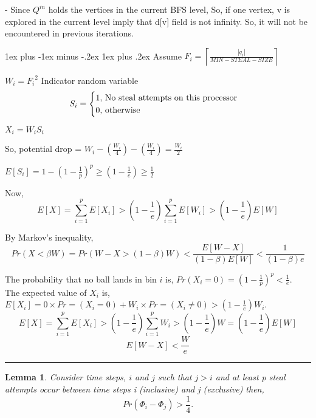 \documentclass[11pt]{article}
\makeatletter
\renewcommand{\subsection}{\@startsection{subsection}{2}{0mm}%
                                     {1ex plus -1ex minus -.2ex}%
                                     {1ex plus .2ex}%
                                     {\normalfont\large\bfseries}}%
\newenvironment{proof}{{\bf Proof:  }}{\hfill\rule{2mm}{2mm}}
\newtheorem{lemma}[fact]{Lemma}
\newcommand{\ceil}[1]{\ensuremath{\left\lceil#1\right\rceil}}
\makeatother
\begin{document}
- Since $Q^{in}$ holds the vertices in the current BFS level, So, if one vertex, v is explored in the current level imply that d[v] field is not infinity. So, it will not be encountered in previous iterations.      
 

\subsection{}
Assume $F_i = \ceil {\frac {|q_i|}{MIN-STEAL-SIZE}}$

$W_i = {F_i}^2$
Indicator random variable \[
S_i = \begin{cases}
1 , $ No steal attempts on this processor$\\
0 , $  otherwise$
\end{cases}
\]

$X_i = W_i S_i$

So, potential drop = $W_i - (\frac{W_i}{4}) - (\frac{W_i}{4}) = \frac{W_i}{2}$

$E[S_i] = 1 - {(1-\frac{1}{p})}^p \geq (1-\frac{1}{e}) \geq \frac{1}{2}$

Now, \[
E \left[ X \right] = \sum \limits_{i=1}^p E \left[ X_i \right] > \left( 1 - \frac{1}{e} \right) \sum \limits_{i=1}^p E[W_i] >\left( 1 - \frac{1}{e} \right) E \left [W \right ]
\]

By Markov's inequality,\\
\[Pr \left( X < \beta W \right) = Pr \left( W - X > (1 - \beta)W \right) < \frac {E \left[ W - X \right]}{\left(1 - \beta \right)  E[W]} < \frac {1}{\left(1 - \beta \right) e }
\]





\begin{proof}
The probability that no ball lands in bin $i$ is, $Pr ( X_i = 0 ) = \left( 1 - \frac{1}{p} \right)^p < \frac {1}{e}$.\\
The expected value of $X_i$ is, $E \left[ X_i \right] = 0 \times Pr =\left( X_i = 0 \right) + W_i \times 
Pr =\left( X_i \ne 0 \right) > \left( 1 - \frac{1}{e} \right) W_i$.\\
\[
E \left[ X \right] = \sum \limits_{i=1}^p E \left[ X_i \right] > \left( 1 - \frac{1}{e} \right) \sum \limits_{i=1}^p W_i >\left( 1 - \frac{1}{e} \right) W = \left( 1 - \frac{1}{e} \right) E\left[ W \right] 
\]
\[
E \left[ W - X \right] < \frac {W}{e}
\]

\end{proof}


\begin{lemma}
Consider time steps, $i$ and $j$ such that $j > i$ and at least p steal attempts occur between time steps i (inclusive) and j (exclusive) then,
\[
Pr \left( \Phi_i - \Phi_j \right)  > \frac {1}{4}.
\]
\label{thm:phases}
\end{lemma}
\end{document}

